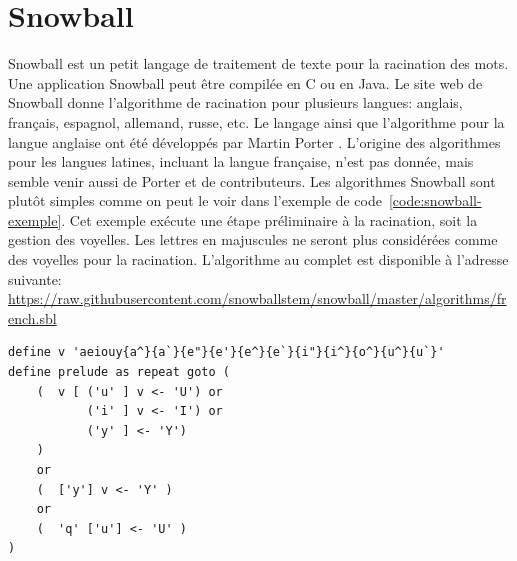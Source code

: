\section{Snowball}
Snowball est un petit langage de traitement de texte pour la racination des mots.
Une application Snowball peut \^etre compil\'ee en C ou en Java.
Le site web de Snowball donne l'algorithme de racination pour plusieurs langues: anglais, fran\c{c}ais, espagnol, allemand, russe, etc.
Le langage ainsi que l'algorithme pour la langue anglaise ont \'et\'e d\'evelopp\'es par Martin Porter \cite{snowball}.
%
%
L'origine des algorithmes pour les langues latines, incluant la langue fran\c{c}aise, n'est pas donn\'ee, mais semble venir aussi de Porter et de contributeurs.
Les algorithmes Snowball sont plut\^ot simples comme on peut le voir dans l'exemple de code~\ref{code:snowball-exemple}.
Cet exemple ex\'ecute une \'etape pr\'eliminaire \`a la racination, soit la gestion des voyelles.
Les lettres en majuscules ne seront plus consid\'er\'ees comme des voyelles pour la racination.
L'algorithme au complet est disponible \`a l'adresse suivante: \url{https://raw.githubusercontent.com/snowballstem/snowball/master/algorithms/french.sbl}
\begin{lstfloat}
\begin{lstlisting}[frame=l]
define v 'aeiouy{a^}{a`}{e"}{e'}{e^}{e`}{i"}{i^}{o^}{u^}{u`}'
define prelude as repeat goto (
    (  v [ ('u' ] v <- 'U') or
           ('i' ] v <- 'I') or
           ('y' ] <- 'Y')
    )
    or
    (  ['y'] v <- 'Y' )
    or
    (  'q' ['u'] <- 'U' )
)
\end{lstlisting}
\caption{Exemple de l'algorithme de racination en fran\c{c}ais en Snowball.}
\label{code:snowball-exemple}
\end{lstfloat}

